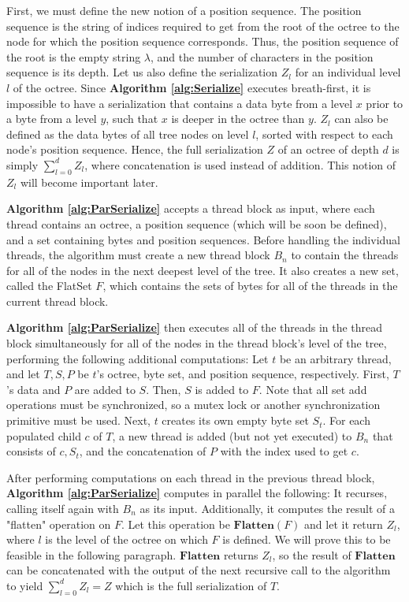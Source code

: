 \documentclass[twoside,twocolumn]{article}
\begin{document}
First, we must define the new notion of a position sequence. The position sequence is the string of indices
required to get from the root of the octree to the node for which the position sequence corresponds. Thus,
the position sequence of the root is the empty string $\lambda$, and the number of characters in the
position sequence is its depth. Let us also define the serialization $Z_l$ for an individual level $l$
of the octree. Since \textbf{Algorithm \ref{alg:Serialize}} executes breath-first, it is impossible to
have a serialization that contains a data byte from a level $x$ prior to a byte from a level $y$, such
that $x$ is deeper in the octree than $y$. $Z_l$ can also be defined as the data bytes of all tree nodes on
level $l$, sorted with respect to each node's position sequence. Hence, the full serialization $Z$ of an
octree of depth $d$ is simply $\sum_{l = 0}^d Z_l$, where concatenation is used instead of addition.
This notion of $Z_l$ will become important later.

\textbf{Algorithm \ref{alg:ParSerialize}} accepts a thread block as input, where each thread contains an
octree, a position sequence (which will be soon be defined), and a set containing bytes and position
sequences.  Before handling the individual threads, the algorithm must create a new thread block
$B_n$ to contain the threads for all of the nodes in the next deepest level of the tree. It also creates
a new set, called the FlatSet $F$, which contains the sets of bytes for all of the threads in the current
thread block.

\textbf{Algorithm \ref{alg:ParSerialize}} then executes all of the threads in the thread block
simultaneously for all of the nodes in the thread block's level of the tree, performing the following
additional computations: Let $t$ be an arbitrary thread, and let $T, S, P$ be $t$'s octree, byte set, and
position sequence, respectively. First, $T$'s data and $P$ are added to $S$. Then, $S$ is added to $F$.
Note that all set add operations must be synchronized, so a mutex lock or another synchronization
primitive must be used. Next, $t$ creates its own empty byte set $S_t$. For each populated child
$c$ of $T$, a new thread is added (but not yet executed) to $B_n$ that consists of $c, S_t$, and the
concatenation of $P$ with the index used to get $c$.

After performing computations on each thread in the previous thread block,
\textbf{Algorithm \ref{alg:ParSerialize}} computes in parallel the following: It recurses, calling itself
again with $B_n$ as its input. Additionally, it computes the result of a "flatten" operation on $F$.
Let this operation be $\mathbf{Flatten}(F)$ and let it return $Z_l$, where $l$ is the level of the octree
on which $F$ is defined. We will prove this to be feasible in the following paragraph. $\mathbf{Flatten}$
returns $Z_l$, so the result of $\mathbf{Flatten}$ can be concatenated with the output of the next recursive
call to the algorithm to yield $\sum_{l = 0}^d Z_l = Z$ which is the full serialization of $T$.
\end{document}
